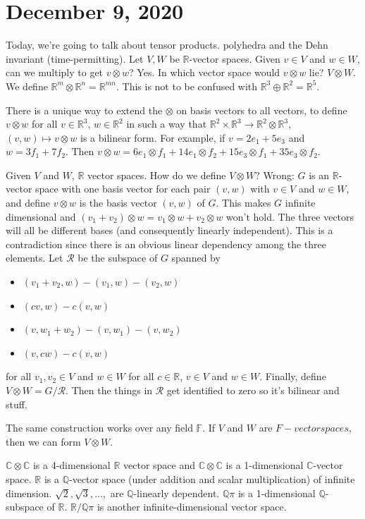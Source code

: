 \documentclass{article}
\newcommand{\C}{\mathbb{C}}
\newcommand{\Q}{\mathbb{Q}}
\newcommand{\R}{\mathbb{R}}
\newcommand{\ra}[1][]{\xrightarrow{#1}}
\begin{document}
\section{December 9, 2020}
Today, we're going to talk about tensor products. polyhedra and the Dehn invariant (time-permitting).
Let $V,W$ be $\R$-vector spaces. Given $v\in V$ and $w\in W$, can we multiply to get $v\otimes w$? Yes. In which vector space would $v\otimes w$ lie? $V\otimes W$. We define $\R^m\otimes \R^n=\R^{mn}$. This is not to be confused with $\R^3\oplus \R^2=\R^5$.

There is a unique way to extend the $\otimes$ on basis vectors to all vectors, to define $v\otimes w$ for all $v\in \R^3$, $w\in \R^2$ in such a way that $\R^2\times \R^3\ra \R^2\otimes \R^3$, $(v,w)\mapsto v\otimes w$ is a bilinear form. For example, if $v=2e_1+5e_3$ and $w=3f_1+7f_2$. Then $v\otimes w=6e_1\otimes f_1+14e_1\otimes f_2+15e_3\otimes f_1 + 35e_3\otimes f_2$.

Given $V$ and $W$, $\R$ vector spaces. How do we define $V\otimes W$?
Wrong: $G$ is an $\R$-vector space with one basis vector for each pair $(v,w)$ with $v\in V$ and $w\in W$, and define $v\otimes w$ is the basis vector $(v,w)$ of $G$. This makes $G$ infinite dimensional and $(v_1+v_2)\otimes w=v_1\otimes w+v_2\otimes w$ won't hold. The three vectors will all be different bases (and consequently linearly independent). This is a contradiction since there is an obvious linear dependency among the three elements. Let $\mathcal R$ be the subspace of $G$ spanned by
\begin{itemize}
    \item $(v_1+v_2,w)-(v_1,w)-(v_2,w)$
    \item $(cv,w)-c(v,w)$
    \item $(v,w_1+w_2)-(v,w_1)-(v,w_2)$
    \item $(v,cw)-c(v,w)$
\end{itemize}
for all $v_1,v_2\in V$ and $w\in W$ for all $c\in \R$, $v\in V$ and $w\in W$. Finally, define $V\otimes W=G/\mathcal R$. Then the things in $\mathcal R$ get identified to zero so it's bilinear and stuff.

The same construction works over any field $\mathbb F$. If $V$ and $W$ are $F-vector spaces$, then we can form $V\otimes W$.
\begin{example}
$\C\otimes\C$ is a 4-dimensional $\R$ vector space and $\C\otimes \C$ is a 1-dimensional $\C$-vector space. $\R$ is a $\Q$-vector space (under addition and scalar multiplication) of infinite dimension. $\sqrt2, \sqrt3,...,$ are $\Q$-linearly dependent. $\Q\pi$ is a 1-dimensional $\Q$-subspace of $\R$. $\R/\Q\pi$ is another infinite-dimensional vector space.
\end{example}
\end{document}
